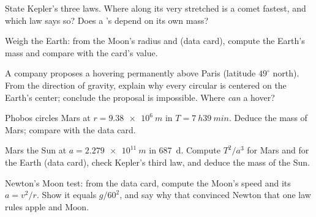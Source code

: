 \begin{exercise}[$\star$]\label{exo:g12:satellites-kepler:5}
State Kepler's three laws. Where along its very stretched 
is a comet fastest, and which law says so? Does a 's
 depend on its own mass?
\end{exercise}

\begin{exercise}[$\star\star$]\label{exo:g12:satellites-kepler:6}
Weigh the Earth: from the Moon's  radius and  (data
card), compute the Earth's mass and compare with the card's value.
\end{exercise}

\begin{exercise}[$\star\star$]\label{exo:g12:satellites-kepler:7}
A company proposes a  hovering permanently above Paris
(latitude $49^\circ$ north). From the direction of gravity, explain
why every circular  is centered on the Earth's center; conclude
the proposal is impossible. Where \emph{can} a  hover?
\end{exercise}

\begin{exercise}[$\star\star$]\label{exo:g12:satellites-kepler:8}
Phobos circles Mars at $r = \qty{9.38e6}{m}$ in $T = \qty{7}{h}
\qty{39}{min}$. Deduce the mass of Mars; compare with the data card.
\end{exercise}

\begin{exercise}[$\star\star$]\label{exo:g12:satellites-kepler:9}
Mars  the Sun at $a = \qty{2.279e11}{m}$ in \qty{687}{d}.
Compute $T^2/a^3$ for Mars and for the Earth (data card), check
Kepler's third law, and deduce the mass of the Sun.
\end{exercise}

\begin{exercise}[$\star\star$]\label{exo:g12:satellites-kepler:10}
Newton's Moon test: from the data card, compute the Moon's speed and
its  $a = v^2/r$. Show it equals $g/60^2$,
and say why that convinced Newton that one law rules apple and Moon.
\end{exercise}

